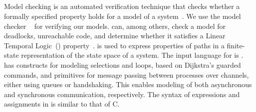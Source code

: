 \subsection{\Promela}
Model checking is an automated verification technique that checks whether a formally specified property holds for a model of a system~\cite{Clarke1999}.
We use the model checker \Spin~\cite{Holzmann2003} for verifying our models.
\Spin can, among others, check a model for deadlocks, unreachable code, and determine whether it satisfies a Linear Temporal Logic~(\LTL) property~\cite{Pnueli1977}.
\LTL is used to express properties of paths in a finite-state representation of the state space of a system.
The input language for \Spin is \Promela.
\Promela has constructs for modeling selections and loops, based on Dijkstra's guarded commands, and primitives for message passing between processes over channels, either using queues or handshaking.
This enables modeling of both asynchronous and synchronous communication, respectively.
The syntax of expressions and assignments in \Promela is similar to that of C. 